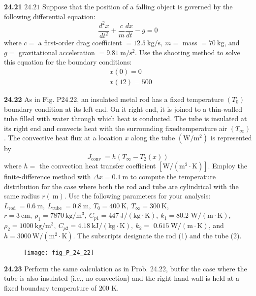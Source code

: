 \documentclass[../main.tex]{subfiles}
\begin{document}
\begin{multicols}{2}
    \noindent\textbf{24.21} $24.21$ Suppose that the position of a falling object is governed by the following differential equation:
    $$
    \frac{d^{2} x}{d t^{2}}+\frac{c}{m} \frac{d x}{d t}-g=0
    $$
    where $c=$ a first-order drag coefficient $=12.5 \mathrm{~kg} / \mathrm{s},\ m=$ mass $=70 \mathrm{~kg}$, and $g=$ gravitational acceleration $=9.81 \mathrm{~m} / \mathrm{s}^{2}$. Use the shooting method to solve this equation for the boundary conditions:
    $$
    \begin{aligned}
    &x(0)=0 \\
    &x(12)=500
    \end{aligned}
    $$\vspace{2mm}

    \noindent\textbf{24.22} As in Fig. P24.22, an insulated metal rod has a fixed temperature $\left(T_{0}\right)$ boundary condition at its left end. On it right end, it is joined to a thin-walled tube filled with water through which heat is conducted. The tube is insulated at its right end and convects heat with the surrounding fixedtemperature air $\left(T_{\infty}\right)$. The convective heat flux at a location $x$ along the tube $\left(\mathrm{W} / \mathrm{m}^{2}\right)$ is represented by
    $$
    J_{\text {conv }}=h\left(T_{\infty}-T_{2}(x)\right)
    $$
    where $h=$ the convection heat transfer coefficient $\left[\mathrm{W} /\left(\mathrm{m}^{2} \cdot \mathrm{K}\right)\right]$. Employ the finite-difference method with $\Delta x=0.1 \mathrm{~m}$ to compute the temperature distribution for the case where both the rod and tube are cylindrical with the same radius $r(\mathrm{~m})$. Use the following parameters for your analysis:
    $L_{\text {rod }}=0.6 \mathrm{~m},\ L_{\text {tube }}=0.8 \mathrm{~m},\ T_{0}=400 \mathrm{~K},\ T_{\infty}=300 \mathrm{~K}$, $r=3 \mathrm{~cm},\ \rho_{1}=7870 \mathrm{~kg} / \mathrm{m}^{3},\ C_{p 1}=447 \mathrm{~J} /(\mathrm{kg} \cdot \mathrm{K}),\ k_{1}=80.2$ $\mathrm{W} /(\mathrm{m} \cdot \mathrm{K})$,
    $\rho_{2}=1000 \mathrm{~kg} / \mathrm{m}^{3},\ C_{p 2}=4.18 \mathrm{~kJ} /(\mathrm{kg} \cdot \mathrm{K}),\ k_{2}=$ $0.615 \mathrm{~W} /(\mathrm{m} \cdot \mathrm{K})$, and $h=3000 \mathrm{~W} /\left(\mathrm{m}^{2} \cdot \mathrm{K}\right)$. The subscripts designate the rod (1) and the tube (2).

    \begin{figure}[H]
        \centering
        \texttt{[image: fig\_P\_24\_22]}
       \caption{}\label{fig:fig_P_24_22}
    \end{figure}\vspace{2mm}

    \noindent\textbf{24.23} Perform the same calculation as in Prob. 24.22, butfor the case where the tube is also insulated (i.e., no convection) and the right-hand wall is held at a fixed boundary temperature of 200 K. 

    
\end{multicols}
\end{document}
